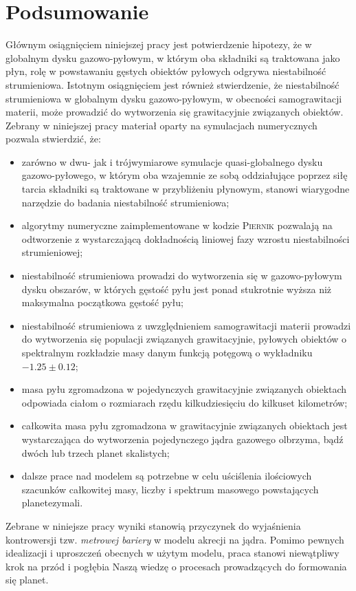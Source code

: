 
\chapter{Podsumowanie}

Głównym osiągnięciem niniejszej pracy jest potwierdzenie hipotezy, że w globalnym
dysku gazowo-pyłowym, w którym oba składniki są traktowana jako płyn, rolę w
powstawaniu gęstych obiektów pyłowych odgrywa niestabilność strumieniowa. 
Istotnym osiągnięciem jest również stwierdzenie, że niestabilność
strumieniowa w globalnym dysku gazowo-pyłowym, w obecności samograwitacji
materii, może prowadzić do wytworzenia się grawitacyjnie związanych obiektów.
Zebrany w niniejszej pracy materiał oparty na symulacjach numerycznych
pozwala stwierdzić, że:

\begin{itemize}
   \item zarówno w dwu- jak i trójwymiarowe symulacje quasi-globalnego dysku
      gazowo-pyłowego, w którym oba wzajemnie ze sobą oddziałujące poprzez siłę
      tarcia składniki są traktowane w przybliżeniu płynowym, stanowi wiarygodne
      narzędzie do badania niestabilność strumieniowa;
   \item algorytmy numeryczne zaimplementowane w kodzie \textsc{Piernik}
      pozwalają na odtworzenie z wystarczającą dokładnością liniowej fazy
      wzrostu niestabilności strumieniowej;
   \item niestabilność strumieniowa prowadzi do wytworzenia się w gazowo-pyłowym
      dysku obszarów, w których gęstość pyłu jest ponad stukrotnie wyższa niż
      maksymalna początkowa gęstość pyłu;
   \item niestabilność strumieniowa z uwzględnieniem samograwitacji materii
      prowadzi do wytworzenia się populacji związanych grawitacyjnie, pyłowych
      obiektów o spektralnym rozkładzie masy danym funkcją potęgową o wykładniku
      $-1.25\pm0.12$;
   \item masa pyłu zgromadzona w pojedynczych grawitacyjnie związanych obiektach
      odpowiada ciałom o rozmiarach rzędu kilkudziesięciu do kilkuset
      kilometrów;
   \item całkowita masa pyłu zgromadzona w grawitacyjnie związanych obiektach
      jest wystarczająca do wytworzenia pojedynczego jądra gazowego
      olbrzyma, bądź dwóch lub trzech planet skalistych;
   \item dalsze prace nad modelem są potrzebne w celu uściślenia ilościowych
      szacunków całkowitej masy, liczby i spektrum masowego powstających
      planetezymali.
\end{itemize}
Zebrane w niniejsze pracy wyniki stanowią przyczynek do wyjaśnienia
kontrowersji tzw. \emph{metrowej bariery} w modelu akrecji na
jądra. Pomimo pewnych idealizacji i uproszczeń obecnych w użytym modelu, praca
stanowi niewątpliwy krok na przód i pogłębia Naszą wiedzę o procesach
prowadzących do formowania się planet.

